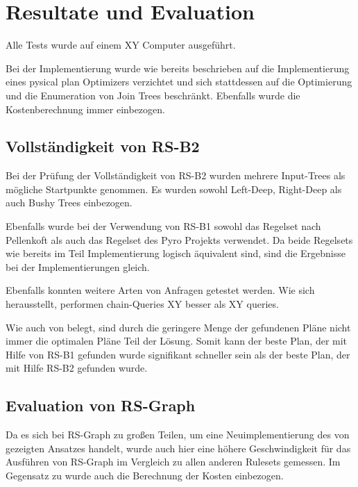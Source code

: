 \chapter{Resultate und Evaluation}

Alle Tests wurde auf einem XY Computer ausgeführt.

Bei der Implementierung wurde wie bereits beschrieben auf die Implementierung eines pysical plan Optimizers verzichtet und sich stattdessen auf die Optimierung und die Enumeration von Join Trees beschränkt. Ebenfalls wurde die Kostenberechnung immer einbezogen.

\section{Vollständigkeit von RS-B2}

Bei der Prüfung der Vollständigkeit von RS-B2 wurden mehrere Input-Trees als mögliche Startpunkte genommen. Es wurden sowohl Left-Deep, Right-Deep als auch Bushy Trees einbezogen. 

Ebenfalls wurde bei der Verwendung von RS-B1 sowohl das Regelset nach Pellenkoft als auch das Regelset des Pyro Projekts verwendet. Da beide Regelsets wie bereits im Teil Implementierung logisch äquivalent sind, sind die Ergebnisse bei der Implementierungen gleich.

Ebenfalls konnten weitere Arten von  Anfragen getestet werden. Wie sich herausstellt, performen chain-Queries XY besser als XY queries.


Wie auch von \cite{XY} belegt, sind durch die geringere Menge der gefundenen Pläne nicht immer die optimalen Pläne Teil der Lösung. Somit kann der beste Plan, der mit Hilfe von RS-B1 gefunden wurde signifikant schneller sein als der beste Plan, der mit Hilfe RS-B2 gefunden wurde. 


\section{Evaluation von RS-Graph}

Da es sich bei RS-Graph zu großen Teilen, um eine Neuimplementierung des von \cite{Moerkotte} gezeigten Ansatzes handelt, wurde auch hier eine höhere Geschwindigkeit für das Ausführen von RS-Graph im Vergleich zu allen anderen Rulesets  gemessen. Im Gegensatz zu \cite{} wurde auch die Berechnung der Kosten einbezogen. 